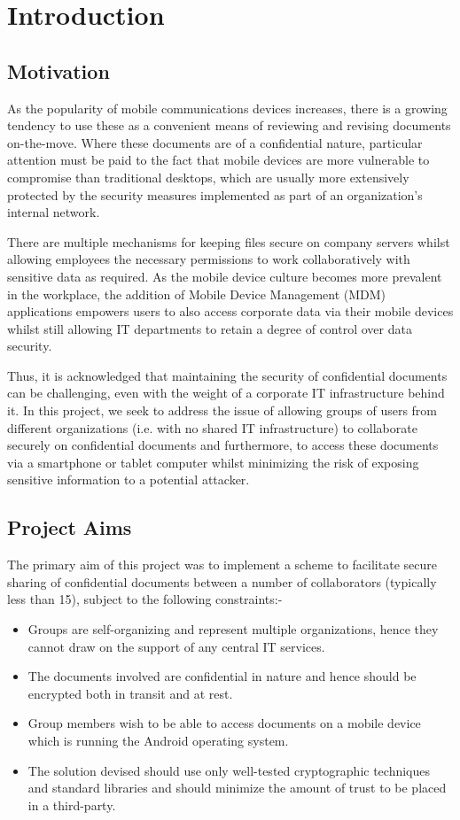 
\chapter{Introduction}
\label{cha:introduction}
\section{Motivation}
\label{sec:motivation}
As the popularity of mobile communications devices increases, there is a growing tendency to use these as a convenient means of reviewing and revising documents on-the-move. Where these documents are of a confidential nature, particular attention must be paid to the fact that mobile devices are more vulnerable to compromise than traditional desktops, which are usually more extensively protected by the security measures implemented as part of an organization's internal network. 

There are multiple mechanisms for keeping files secure on company servers whilst allowing employees the necessary permissions to work collaboratively with sensitive data as required.  As the mobile device culture becomes more prevalent in the workplace, the addition of Mobile Device Management (MDM) applications empowers users to also access corporate data via their mobile devices whilst still allowing IT departments to retain a degree of control over data security.  

Thus, it is acknowledged that maintaining the security of confidential documents can be challenging, even with the weight of a corporate IT infrastructure behind it.  In this project, we seek to address the issue of allowing groups of users from different organizations (i.e. with no shared IT infrastructure) to collaborate securely on confidential documents and furthermore, to access these documents via a smartphone or tablet computer whilst minimizing the risk of exposing sensitive information to a potential attacker.


\section{Project Aims}
\label{sec:aims}
The primary aim of this project was to implement a scheme to facilitate secure sharing of confidential documents between a number of collaborators (typically less than 15), subject to the following constraints:-
\begin{itemize}
\item Groups are self-organizing and represent multiple organizations, hence they cannot draw on the support of any central IT services.
\item The documents involved are confidential in nature and hence should be encrypted both in transit and at rest.
\item Group members wish to be able to access documents on a mobile device which is running the Android operating system.
\item The solution devised should use only well-tested cryptographic techniques and standard libraries and should minimize the amount of trust to be placed in a third-party.
\end{itemize}

